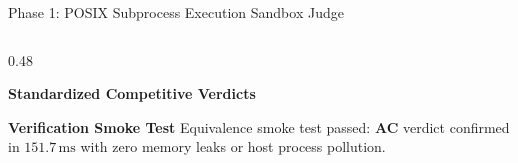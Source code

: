 \documentclass[aspectratio=169,10pt]{beamer}
\begin{document}
\begin{frame}{Phase 1: POSIX Subprocess Execution Sandbox Judge}
\begin{columns}[T]
    \begin{column}{0.48\textwidth}
      \begin{exampleblock}{\textbf{Standardized Competitive Verdicts}}
        \begin{center}
          \scriptsize
        \end{center}
      \end{exampleblock}
      \vspace{2pt}
      \begin{block}{\textbf{Verification Smoke Test}}
        \footnotesize
        Equivalence smoke test passed: \textbf{AC} verdict confirmed in $151.7\,\text{ms}$ with zero memory leaks or host process pollution.
      \end{block}
    \end{column}
  \end{columns}
\end{frame}
\end{document}

